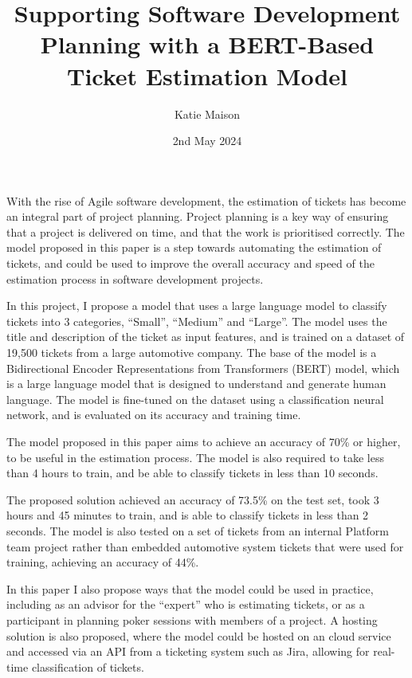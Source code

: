 \documentclass{UoYCSproject}
\author{Katie Maison}
\title{Supporting Software Development Planning with a BERT-Based Ticket Estimation Model}
\date{2nd May 2024}
\begin{document}
\maketitle
\listoffigures
\listoftables

    \begin{summary}
        With the rise of Agile software development, the estimation of tickets has become an integral part of project planning.
        Project planning is a key way of ensuring that a project is delivered on time, and that the work is prioritised correctly.
        The model proposed in this paper is a step towards automating the estimation of tickets, and could be used to improve the overall accuracy and speed of the estimation process in software development projects.\par

        In this project, I propose a model that uses a large language model to classify tickets into 3 categories, “Small”, “Medium” and “Large”.
        The model uses the title and description of the ticket as input features, and is trained on a dataset of 19,500 tickets from a large automotive company.
        The base of the model is a Bidirectional Encoder Representations from Transformers (BERT) model, which is a large language model that is designed to understand and generate human language.
        The model is fine-tuned on the dataset using a classification neural network, and is evaluated on its accuracy and training time.

        The model proposed in this paper aims to achieve an accuracy of 70\% or higher, to be useful in the estimation process.
        The model is also required to take less than 4 hours to train, and be able to classify tickets in less than 10 seconds. \par

        The proposed solution achieved an accuracy of 73.5\% on the test set, took 3 hours and 45 minutes to train, and is able to classify tickets in less than 2 seconds.
        The model is also tested on a set of tickets from an internal Platform team project rather than embedded automotive system tickets that were used for training, achieving an accuracy of 44\%.

        In this paper I also propose ways that the model could be used in practice, including as an advisor for the “expert” who is estimating tickets, or as a participant in planning poker sessions with members of a project.
        A hosting solution is also proposed, where the model could be hosted on an cloud service and accessed via an API from a ticketing system such as Jira, allowing for real-time classification of tickets. \par


\end{summary}
\end{document}
